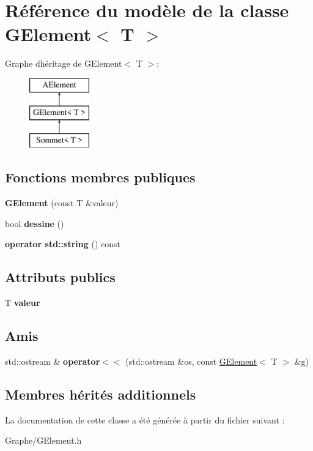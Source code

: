 \hypertarget{class_g_element}{}\section{Référence du modèle de la classe G\+Element$<$ T $>$}
\label{class_g_element}
Graphe d\textquotesingle{}héritage de G\+Element$<$ T $>$\+:\begin{figure}[H]
\begin{center}
\leavevmode
\includegraphics[height=3.000000cm]{class_g_element}
\end{center}
\end{figure}
\subsection*{Fonctions membres publiques}
\begin{DoxyCompactItemize}
\item 
\mbox{\label{class_g_element_aa146c9f9ba963801625e2a3dff44f158}} 
{\bfseries G\+Element} (const T \&valeur)
\item 
\mbox{\label{class_g_element_a96c6f7dea787ae06832a63614fcc73c8}} 
bool {\bfseries dessine} ()
\item 
\mbox{\label{class_g_element_a49324204c5ab68edda8cb9e1bbbd9427}} 
{\bfseries operator std\+::string} () const
\end{DoxyCompactItemize}
\subsection*{Attributs publics}
\begin{DoxyCompactItemize}
\item 
\mbox{\label{class_g_element_a13f5bef10c2f47e9304b57f8de5891e7}} 
T {\bfseries valeur}
\end{DoxyCompactItemize}
\subsection*{Amis}
\begin{DoxyCompactItemize}
\item 
\mbox{\label{class_g_element_a9665a4bc32e83d93522f6d739c837b89}} 
std\+::ostream \& {\bfseries operator$<$$<$} (std\+::ostream \&os, const \mbox{\hyperlink{class_g_element}{G\+Element}}$<$ T $>$ \&g)
\end{DoxyCompactItemize}
\subsection*{Membres hérités additionnels}


La documentation de cette classe a été générée à partir du fichier suivant \+:\begin{DoxyCompactItemize}
\item 
Graphe/G\+Element.\+h\end{DoxyCompactItemize}
